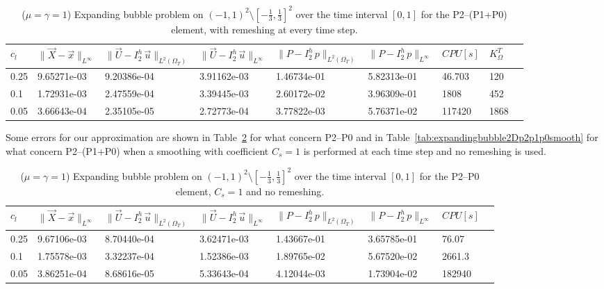 \documentclass[a4paper,12pt,onecolumn]{article}
\newcommand{\errorXx}{\|\vec{X} - \vec{x}\|_{L^\infty}}
\newcommand{\LerrorUu}[1]{\|\vec U - I^h_{#1}\,\vec u\|_{L^2(\Omega_T)}}
\newcommand{\errorUu}[1]{\|\vec U - I^h_{#1}\,\vec u\|_{L^\infty}}
\newcommand{\errorPp}[1]{\|P - I^h_{#1}\,p\|_{L^\infty}}
\newcommand{\LerrorPp}[1]{\|P - I^h_{#1}\,p\|_{L^2(\Omega_T)}}
\begin{document}
\begin{table}
 \center
 \hspace*{-2cm}
\begin{tabular}{lllllllll}
\hline
$c_l$ & $\errorXx$ & $\LerrorUu2$ & $\errorUu2$ & $\LerrorPp2$ & $\errorPp2$ & $CPU[s]$ & $K_\Omega^T$\\
\hline
0.25 & 9.65271e-03 & 9.20386e-04 & 3.91162e-03 & 1.46734e-01 & 5.82313e-01 & 46.703 & 120\\
0.1 & 1.72931e-03 & 2.47559e-04 & 3.39445e-03 & 2.60172e-02 & 3.96309e-01 & 1808 & 452\\
0.05 & 3.66643e-04 & 2.35105e-05 & 2.72773e-04 & 3.77822e-03 & 5.76371e-02 & 117420 & 1868\\
\hline
\end{tabular}
\hspace*{-2cm}
\caption{($\mu=\gamma=1$) Expanding bubble problem on $(-1,1)^2\setminus[-\frac{1}{3},\frac{1}{3}]^2$ over the time interval $[0,1]$ for the P2--(P1+P0) element, with remeshing at every time step.}
\label{tab:expandingbubble2Dp2p1p0remesh}
\end{table}

Some errors for our approximation are shown in Table~\ref{tab:expandingbubble2Dp2p0smooth} for what concern P2--P0 and in Table~\ref{tab:expandingbubble2Dp2p1p0smooth} for what concern P2--(P1+P0) when a smoothing with coefficient $C_s=1$ is performed at each time step and no remeshing is used.

\begin{table}
 \center
 \hspace*{-2cm}
\begin{tabular}{llllllll}
\hline
$c_l$ & $\errorXx$ & $\LerrorUu2$ & $\errorUu2$ & $\LerrorPp2$ & $\errorPp2$ & $CPU[s]$\\
\hline
0.25 & 9.67106e-03 & 8.70440e-04 & 3.62471e-03 & 1.43667e-01 & 3.65785e-01 & 76.07\\
0.1 & 1.75578e-03 & 3.32237e-04 & 1.52386e-03 & 1.89765e-02 & 5.67520e-02 & 2661.3\\
0.05 & 3.86251e-04 & 8.68616e-05 & 5.33643e-04 & 4.12044e-03 & 1.73904e-02 & 182940\\ 
\hline
\end{tabular}
\hspace*{-2cm}
\caption{($\mu=\gamma=1$) Expanding bubble problem on $(-1,1)^2\setminus[-\frac{1}{3},\frac{1}{3}]^2$ over the time interval $[0,1]$ for the P2--P0 element, $C_s=1$ and no remeshing.}
\label{tab:expandingbubble2Dp2p0smooth}
\end{table}
\end{document}
